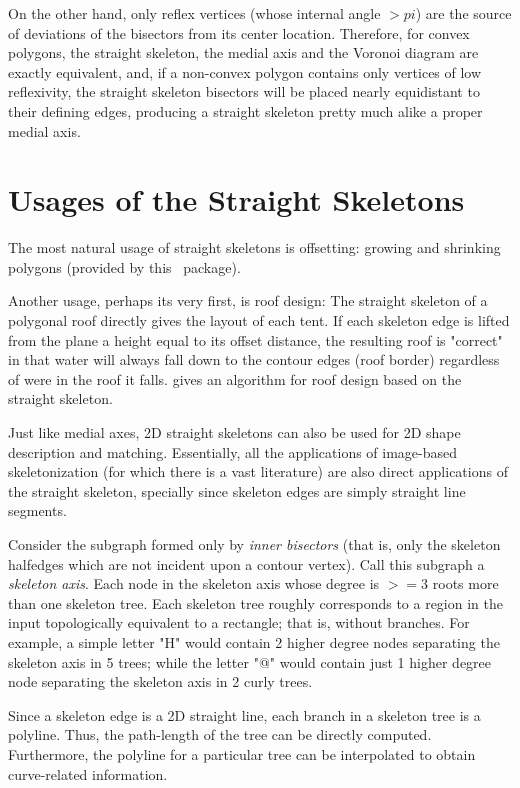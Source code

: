 On the other hand, only reflex vertices (whose internal angle $>pi$)
are the source of deviations of the bisectors from its center
location. Therefore, for convex polygons, the straight skeleton, the
medial axis and the Voronoi diagram are exactly equivalent,
and, if a non-convex polygon contains only vertices of low
reflexivity, the straight skeleton bisectors will be placed nearly
equidistant to their defining edges, producing a straight skeleton
pretty much alike a proper medial axis.


\section{Usages of the Straight Skeletons}  

The most natural usage of straight skeletons is offsetting: growing and shrinking polygons (provided by this  \cgal\ package).

Another usage, perhaps its very first, is roof design: The straight skeleton of a polygonal roof directly gives the layout of each tent. If each skeleton edge is lifted from the plane a height equal to its offset distance, the resulting roof is "correct" in that water will always fall down to the contour edges (roof border) regardless of were in the roof it falls. \cite{cgal:ld-agrm-03} gives an algorithm for roof design based on the straight skeleton.

Just like medial axes, 2D straight skeletons can also be used for 2D shape description and matching. Essentially, all the applications of image-based skeletonization (for which there is a vast literature) are also direct applications of the straight skeleton, specially since skeleton edges are simply straight line segments.

Consider the subgraph formed only by \textit{inner bisectors} (that is, only the skeleton halfedges which are not incident upon a contour vertex). Call this subgraph a {\em skeleton axis}.
Each node in the skeleton axis whose degree is $>=3$ roots more than one skeleton tree. Each skeleton tree roughly corresponds to a region in the input topologically equivalent to a rectangle; that is, without branches. For example, a simple letter "H" would contain 2 higher degree nodes separating the skeleton axis in 5 trees; while the letter "@" would contain just 1 higher degree node separating the skeleton axis in 2 curly trees. 

Since a skeleton edge is a 2D straight line, each branch in a skeleton tree is a polyline. Thus, the path-length of the tree can be directly computed. Furthermore, the polyline for a particular tree can be interpolated to obtain curve-related information.

